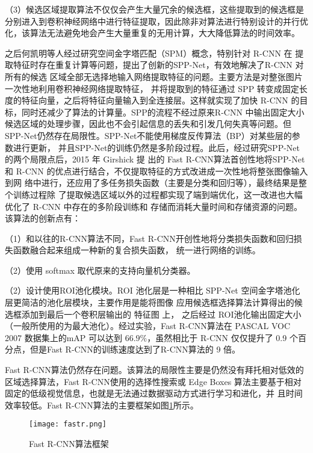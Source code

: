 （3）候选区域提取算法不仅仅会产生大量冗余的候选框，这些提取到的候选框是分别进入到卷积神经网络中进行特征提取，因此除非对算法进行特别设计的并行优化，该算法无法避免地会产生大量重复的无用计算，大大降低算法的时间效率。

之后何凯明等人经过研究空间金字塔匹配（SPM）概念，特别针对 R-CNN 在
提取特征时存在重复计算等问题，提出了创新的SPP-Net\cite{purkait2017spp}，有效地解决了R-CNN 对所有的候选
区域全部无选择地输入网络提取特征的问题。主要方法是对整张图片一次性地利用卷积神经网络提取特征，
并将提取到的特征通过 SPP 转变成固定长度的特征向量，之后将特征向量输入到全连接层。这样就实现了加快
R-CNN 的目标，同时还减少了算法的计算量。SPP的流程不经过原来R-CNN 中输出固定大小候选区域的处理步骤，因此也不会引起信息的丢失和引发几何失真等问题。但
SPP-Net仍然存在局限性。SPP-Net不能使用梯度反传算法（BP）对某些层的参数进行更新，
并且SPP-Net的训练仍然是多阶段过程。此后，经过研究SPP-Net 的两个局限点后，2015 年 Girshick 提
出的 Fast R-CNN\cite{girshick2015fast}算法首创性地将SPP-Net 和 R-CNN 的优点进行结合，不仅提取特征的方式改进成一次性地将整张图像输入到网
络中进行，还应用了多任务损失函数（主要是分类和回归等），最终结果是整个训练过程除
了提取候选区域以外的过程都实现了端到端优化，这一改进也大幅优化了 R-CNN 中存在的多阶段训练和
存储而消耗大量时间和存储资源的问题。该算法的创新点有：

（1）和以往的R-CNN算法不同，Fast R-CNN开创性地将分类损失函数和回归损失函数融合起来组成一种新的复合损失函数，
统一进行网络的训练。

（2）使用 softmax 取代原来的支持向量机分类器。

（2）设计使用ROI池化模块。ROI
池化层是一种相比 SPP-Net 空间金字塔池化层更简洁的池化层模块，主要作用是能将图像
应用候选框选择算法计算得出的候选框添加到最后一个卷积层输出的 特征图 上，
之后经过 ROI池化输出固定大小（一般所使用的为最大池化）。经过实验，Fast R-CNN算法在
PASCAL VOC 2007 数据集上的mAP 可以达到 $66.9\%$，虽然相比于 R-CNN 仅仅提升了 0.9
个百分点，但是Fast R-CNN的训练速度达到了R-CNN算法的 9 倍。

Fast R-CNN算法仍然存在问题。该算法的局限性主要是仍然没有拜托相对低效的区域选择算法，Fast R-CNN使用的选择性搜索或 Edge Boxes 算法主要基于相对固定的低级视觉信息，也就是无法通过数据驱动方式进行学习和进化，并
且时间效率较低。Fast R-CNN算法的主要框架如图\ref{fastr}所示。

\begin{figure}[htbp]
    \centering
    \texttt{[image: fastr.png]}
    \caption{Fast R-CNN算法框架}
    \label{fastr}
\end{figure}

